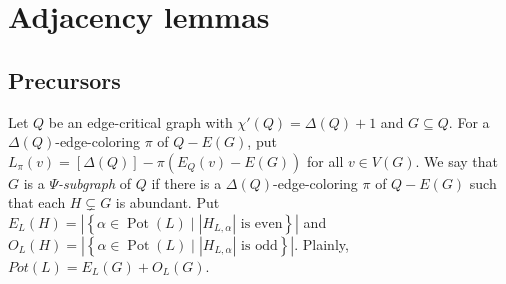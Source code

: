 \documentclass[12pt,reqno]{amsart}
\theoremstyle{plain}
\theoremstyle{definition}
\theoremstyle{remark}
\newcommand{\setb}[3]{\left\{ #1 \in #2 \mid #3 \right\}}
\newcommand{\card}[1]{\left|#1\right|}
\newcommand{\irange}[1]{\left[#1\right]}
\newcommand{\parens}[1]{\left( #1 \right)}
\newcommand{\pot}{\operatorname{Pot}}
\begin{document}
\section{Adjacency lemmas}
\subsection{Precursors}
Let $Q$ be an edge-critical graph with $\chi'(Q) = \Delta(Q) + 1$ and $G \subseteq Q$.  For a $\Delta(Q)$-edge-coloring $\pi$ of $Q - E(G)$, put $L_\pi(v) = \irange{\Delta(Q)} - \pi\parens{E_Q(v) - E(G)}$ for all $v \in V(G)$.  We say that $G$ is a \emph{$\Psi$-subgraph} of $Q$ if there is a $\Delta(Q)$-edge-coloring $\pi$ of $Q - E(G)$ such that each $H \subsetneq G$ is abundant. Put $E_{L}(H) = \card{\setb{\alpha}{\pot(L)}{\card{H_{L, \alpha}} \text{ is even}}}$ and $O_{L}(H) = \card{\setb{\alpha}{\pot(L)}{\card{H_{L, \alpha}} \text{ is odd}}}$.  Plainly, $Pot(L) = E_{L}(G) + O_{L}(G)$.
\end{document}
